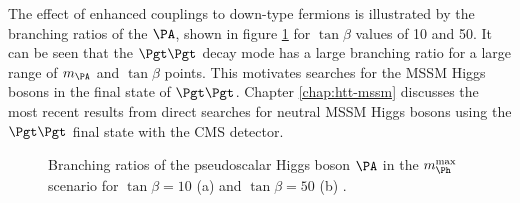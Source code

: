 The effect of enhanced couplings to down-type fermions is illustrated by the
branching ratios of the $\PA$, shown in figure \ref{fig:mhmaxBRs} for $\tan\beta$
values of 10 and 50. It can be seen that the $\Pgt\Pgt$ decay mode has a large
branching ratio for a large range of $m_{\PA}$ and $\tan\beta$ points. This
motivates searches for the \ac{MSSM} Higgs bosons in the final state of $\Pgt\Pgt$. 
Chapter \ref{chap:htt-mssm} discusses the most recent results 
from direct searches for neutral \ac{MSSM} Higgs bosons using the $\Pgt\Pgt$
final state with the CMS detector.

\begin{figure}[htbp]
\caption[Branching ratios of the pseudoscalar Higgs boson $\PA$ in the
$m_{\Ph}^{\text{max}}$ scenario.]{Branching ratios of the pseudoscalar Higgs boson $\PA$ in the
$m_{\Ph}^{\text{max}}$ scenario for $\tan\beta=10$ (a) and $\tan\beta=50$
(b) \cite{Heinemeyer:2013tqa}.}
\label{fig:mhmaxBRs}
\end{figure}

